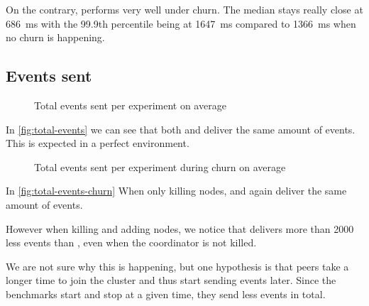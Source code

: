 On the contrary, \epto performs very well under churn. The median stays really close at \SI{686}{\milli\second} with the 99.9th percentile being at \SI{1647}{\milli\second} compared to \SI{1366}{\milli\second} when no churn is happening.
\newpage
\subsection{Events sent}
\begin{figure}[h]
	\centering
	
	\vspace{-2mm} 
	\caption{Total events sent per experiment on average}
	\vspace{-2mm}
	\label{fig:total-events}   
\end{figure}
In \autoref{fig:total-events} we can see that both \epto and \jgroups deliver the same amount of events. This is expected in a perfect environment.
\begin{figure}[h]
	\centering
	
	\vspace{-2mm} 
	\caption{Total events sent per experiment during churn on average}
	\vspace{-2mm}
	\label{fig:total-events-churn}  
\end{figure}

In \autoref{fig:total-events-churn} When only killing nodes, \epto and \jgroups again deliver the same amount of events.

However when killing and adding nodes, we notice that \jgroups delivers more than 2000 less events than \epto, even when the coordinator is not killed.

We are not sure why this is happening, but one hypothesis is that \jgroups peers take a longer time to join the cluster and thus start sending events later. Since the benchmarks start and stop at a given time, they send less events in total.
